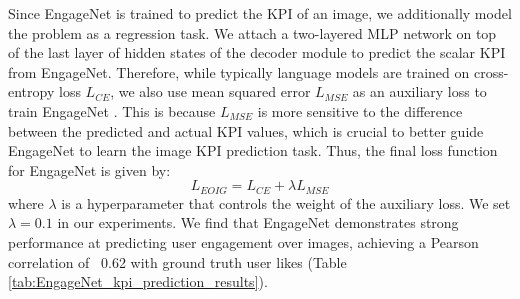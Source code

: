      
 
 
 

 


 
 Since EngageNet is trained to predict the KPI of an image, we additionally model the problem as a regression task. We attach a two-layered MLP network on top of the last layer of hidden states of the decoder module to predict the scalar KPI from EngageNet. Therefore, while typically language models are trained on cross-entropy loss $L_{CE}$, we also use mean squared error $L_{MSE}$ as an auxiliary loss to train EngageNet%
 . This is because $L_{MSE}$ is more sensitive to the difference between the predicted and actual KPI values, which is crucial to better guide EngageNet to learn the image KPI prediction task. Thus, the final loss function for EngageNet is given by:
 \begin{equation}
     L_{EOIG} = L_{CE} + \lambda L_{MSE}
 \end{equation}
 where $\lambda$ is a hyperparameter that controls the weight of the auxiliary loss. We set $\lambda = 0.1$ in our experiments. We find that EngageNet demonstrates strong performance at predicting user engagement over images, achieving a Pearson correlation of ~0.62 with ground truth user likes (Table \ref{tab:EngageNet_kpi_prediction_results}).



